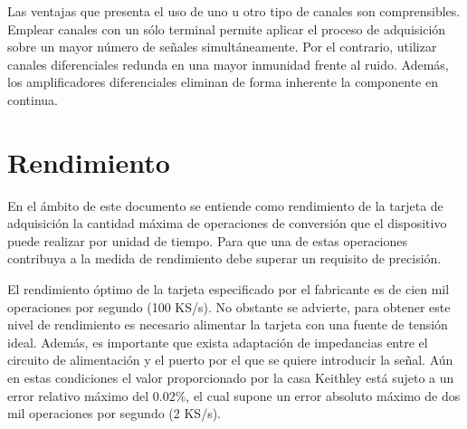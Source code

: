 Las ventajas que presenta el uso de uno u otro tipo de canales son
comprensibles. Emplear canales con un sólo terminal permite aplicar el
proceso de adquisición sobre un mayor número de señales simultáneamente.
Por el contrario, utilizar canales diferenciales redunda en una mayor
inmunidad frente al ruido. Además, los amplificadores diferenciales
eliminan de forma inherente la componente en continua.


\section{Rendimiento}\label{sec:throughput}

En el ámbito de este documento se entiende como rendimiento de la tarjeta
de adquisición la cantidad máxima de operaciones de conversión que el
dispositivo puede realizar por unidad de tiempo. Para que una de estas
operaciones contribuya a la medida de rendimiento debe superar un requisito
de precisión.

El rendimiento óptimo de la tarjeta \kpci{} especificado por el fabricante
es de cien mil operaciones por segundo (100 KS/s). No obstante se advierte,
para obtener este nivel de rendimiento es necesario alimentar la tarjeta
con una fuente de tensión ideal. Además, es importante que exista
adaptación de impedancias entre el circuito de alimentación y el puerto por
el que se quiere introducir la señal. Aún en estas condiciones el valor
proporcionado por la casa Keithley está sujeto a un error relativo máximo
del $0.02\%$, el cual supone un error absoluto máximo de dos mil
operaciones por segundo (2 KS/s).

